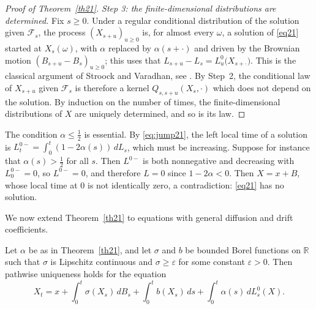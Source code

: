 \begin{proof}[Proof of Theorem~\ref{th21}]
	\emph{Step 3: the finite-dimensional distributions are determined.} Fix
	$s\geqslant 0$. Under a regular conditional distribution of the solution given
	$\mathcal{F}_s$, the process $(X_{s+u})_{u\geqslant 0}$ is, for almost every
	$\omega$, a solution of \eqref{eq21} started at $X_s(\omega)$, with $\alpha$
	replaced by $\alpha(s+\cdot)$ and driven by the Brownian motion
	$(B_{s+u}-B_s)_{u\geqslant 0}$; this uses that
	$L_{s+u} - L_s = L^0_u\big(X_{s+\cdot}\big)$. This is the classical argument of
	Stroock and Varadhan, see \citet[Section~5.4]{KaratzasShreve1991}. By Step~2,
	the conditional law of $X_{s+u}$ given $\mathcal{F}_s$ is therefore a kernel
	$Q_{s,s+u}(X_s,\cdot)$ which does not depend on the solution. By induction on
	the number of times, the finite-dimensional distributions of $X$ are uniquely
	determined, and so is its law.
\end{proof}

\begin{remark}
	The condition $\alpha \leqslant \frac{1}{2}$ is essential. By
	\eqref{eq:jump21}, the left local time of a solution is
	$L^{0-}_t = \int_0^t (1-2\alpha(s))\,dL_s$, which must be increasing. Suppose
	for instance that $\alpha(s) > \frac{1}{2}$ for all $s$. Then $L^{0-}$ is both
	nonnegative and decreasing with $L^{0-}_0 = 0$, so $L^{0-} = 0$, and therefore
	$L = 0$ since $1-2\alpha < 0$. Then $X = x + B$, whose local time at $0$ is not
	identically zero, a contradiction: \eqref{eq21} has no solution.
\end{remark}

We now extend Theorem~\ref{th21} to equations with general diffusion and drift
coefficients.

\begin{theorem}\label{th:general21}
	Let $\alpha$ be as in Theorem~\ref{th21}, and let $\sigma$ and $b$ be bounded
	Borel functions on $\mathbb{R}$ such that $\sigma$ is Lipschitz continuous and
	$\sigma \geqslant \varepsilon$ for some constant $\varepsilon > 0$. Then pathwise
	uniqueness holds for the equation
	\begin{equation}\label{e28}
		X_t=x+\int_0^t \sigma (X_s)\,dB_s + \int_0^t b(X_s)\,ds + \int_0^t \alpha (s)\,dL^0_s(X) .
	\end{equation}
\end{theorem}

